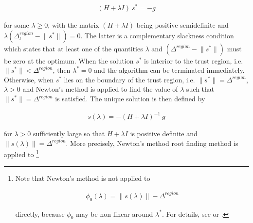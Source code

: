 

\begin{align}
    ( H + \lambda I ) \ s^* = - g
    \label{eq:exact-solution}
\end{align}

\noindent for some $\lambda \geq 0$, with the matrix $( H + \lambda I )$ being positive semidefinite and 
$\lambda (\Delta^{region}_{t}  - \lVert s^* \rVert) = 0$. The latter is a complementary slackness condition
which states that at least one of the quantities $\lambda$ and $(\Delta^{region}  - \lVert s^* \rVert)$
must be zero at the optimum.
When the solution $s^*$ is interior to the trust region, i.e. $\lVert s^* \rVert < \Delta^{region}$,
then $\lambda^*= 0$ and the algorithm can be terminated immediately.
Otherwise, when $s^*$ lies on the boundary of the trust region, i.e. $\lVert s^* \rVert = \Delta^{region}$,
$\lambda > 0$ and Newton's method is applied to find the value of $\lambda$ such that 
$\lVert s^* \rVert = \Delta^{region}$ is satisfied.
The unique solution is then defined by 

\begin{align}
    s (\lambda) = -(H + \lambda I)^{-1} \ g
    \label{eq:boundary-solution}
\end{align}

\noindent for $\lambda> 0$ sufficiently large so that $H + \lambda I$ is positive definite and 
$ \lVert s (\lambda) \rVert = \Delta^{region}  $. More precisely, Newton's method root finding method is applied to \footnote{Note that Newton's method is not applied to 

\begin{align}
    \phi_0 (\lambda) = \lVert s (\lambda) \rVert - \Delta^{region}
    \label{eq:root-finding}
\end{align}

\noindent directly, because $\phi_0$ may be non-linear around $\lambda^*$. For details, see \cite{More1983} or \cite{Nocedal2006}.}

